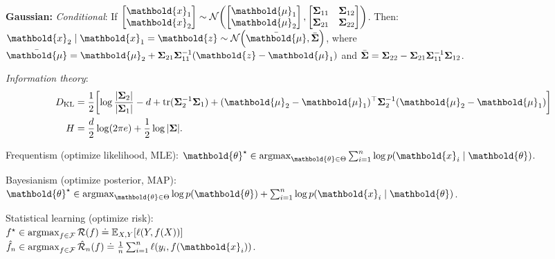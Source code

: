 \documentclass[9pt]{extarticle}
\newenvironment{topic}[1]
{\textbf{\sffamily \colorbox{black}{\rlap{\textbf{\textcolor{white}{#1}}}\hspace{\linewidth}\hspace{-2\fboxsep}}}}
{}
\newenvironment{subtopic}[1]
{\textbf{\sffamily #1:}}
{}
\renewcommand{\det}[1]{|#1|}
\renewcommand{\mat}[1]{\ensuremath{\mathbf{#1}}}
\renewcommand{\vec}[1]{\ensuremath{\mathbold{#1}}}
\begin{document}
\begin{multicols*}{3}
\begin{subtopic}{Gaussian}
        \textit{Conditional}: If $\begin{bmatrix} \vec{x}_1 \\ \vec{x}_2 \end{bmatrix} \sim \mathcal{N}\lft( \begin{bmatrix} \vec{\mu}_1 \\ \vec{\mu}_2 \end{bmatrix}, \begin{bmatrix} \mat{\Sigma}_{11} & \mat{\Sigma}_{12} \\ \mat{\Sigma}_{21} & \mat{\Sigma}_{22} \end{bmatrix} \rgt)$.
        Then: $\vec{x}_2 \mid \vec{x}_1 = \vec{z} \sim \mathcal{N}\lft( \bar{\vec{\mu}}, \bar{\mat{\Sigma}}
            \rgt)$, where $\bar{\vec{\mu}} = \vec{\mu}_2 + \mat{\Sigma}_{21} \inv{\mat{\Sigma}_{11}}
            (\vec{z} - \vec{\mu}_1)$ and $\bar{\mat{\Sigma}} = \mat{\Sigma}_{22} - \mat{\Sigma}_{21}
            \inv{\mat{\Sigma}_{11}} \mat{\Sigma}_{12}$.

        \textit{Information theory}:{\footnotesize
        \begin{align*}
            D_{\mathrm{KL}} & = \frac{1}{2} \lft[ \log \frac{\det{\mat{\Sigma}_2}}{\det{\mat{\Sigma}_1}} - d + \mathrm{tr}(\inv{\mat{\Sigma}_2} \mat{\Sigma}_1) + \transpose{(\vec{\mu}_2 - \vec{\mu}_1)} \inv{\mat{\Sigma}_2} (\vec{\mu}_2 - \vec{\mu}_1) \rgt] \\
            H               & = \frac{d}{2} \log(2\pi e) + \frac{1}{2} \log \det{\mat{\Sigma}}.
        \end{align*}}

    \end{subtopic}

    \begin{topic}{Paradigms of data science}
        Frequentism (optimize likelihood, MLE): $\vec{\theta}^\star \in \argmax_{\vec{\theta} \in \Theta} \sum_{i=1}^{n} \log p(\vec{x}_i \mid \vec{\theta})$.

        Bayesianism (optimize posterior, MAP): $\vec{\theta}^\star \in \argmax_{\vec{\theta} \in \Theta}
            \log p(\vec{\theta}) + \sum_{i=1}^{n} \log p(\vec{x}_i \mid \vec{\theta})$.

        Statistical learning (optimize risk): \\ $f^\star \in \operatorname*{argmax}_{f \in \mathcal{F}} \mathcal{R}(f)
            \doteq \mathbb{E}_{X,Y}[\ell(Y, f(X))]$ \\ $\hat{f}_n \in \argmax_{f \in \mathcal{F}}
            \hat{\mathcal{R}}_n(f) \doteq \frac{1}{n} \sum_{i=1}^{n} \ell(y_i, f(\vec{x}_i))$.
    \end{topic}


\end{multicols*}
\end{document}
